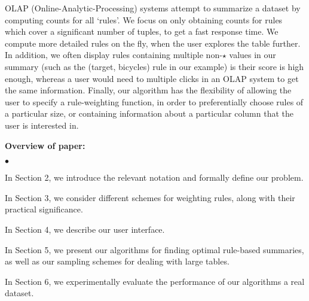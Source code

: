 \documentclass{sig-alternate}
\newcommand{\squishlist}{
   \begin{list}{$\bullet$}
    { \setlength{\itemsep}{0pt}
      \setlength{\parsep}{2pt}
      \setlength{\topsep}{2pt}
      \setlength{\partopsep}{0pt}
    }
}
\newcommand{\stitle}[1]{\vspace{0.5em}\noindent\textbf{#1}}
\newcommand{\squishend}{\end{list}}
\begin{document}
 
OLAP (Online-Analytic-Processing) systems attempt to summarize a dataset by computing counts for all `rules'. We focus on only obtaining counts for rules which cover a significant number of tuples, to get a fast response time. We compute more detailed rules on the fly, when the user explores the table further. In addition, we often display rules containing multiple non-$\star$ values in our summary (such as the (target, bicycles) rule in our example) is their score is high enough, whereas a user would need to multiple clicks in an OLAP system to get the same information. Finally, our algorithm has the flexibility of allowing the user to specify a rule-weighting function, in order to preferentially choose rules of a particular size, or containing information about a particular column that the user is interested in.
 
\stitle{Overview of paper:} 
\squishlist 

\item In Section 2, we introduce the relevant notation and formally define our problem.

\item In Section 3, we consider different schemes for weighting rules, along with their practical significance.

\item In Section 4, we describe our user interface. 
  
\item In Section 5, we present our algorithms for finding optimal rule-based summaries, as well as our sampling schemes for dealing with large tables.

\item In Section 6, we experimentally evaluate the performance of our algorithms a real dataset.
\squishend 
\end{document}
